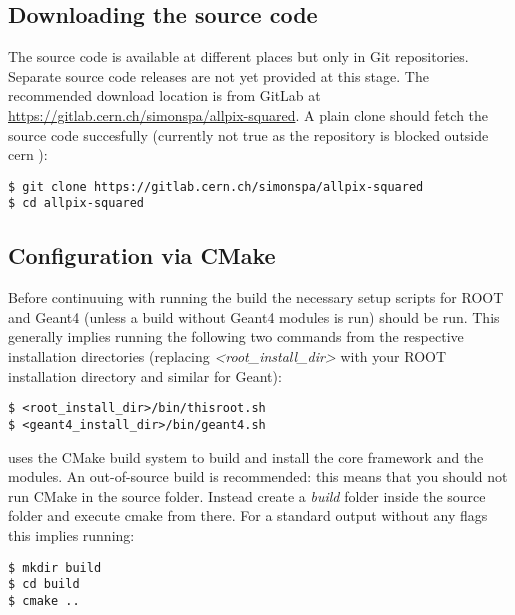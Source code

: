 \subsection{Downloading the source code}
The source code is available at different places but only in Git repositories. Separate source code releases are not yet provided at this stage. The recommended download location is from GitLab at \url{https://gitlab.cern.ch/simonspa/allpix-squared}. A plain clone should fetch the source code succesfully (\todo currently not true as the repository is blocked outside cern \todo):

\begin{verbatim}
$ git clone https://gitlab.cern.ch/simonspa/allpix-squared
$ cd allpix-squared
\end{verbatim}

\subsection{Configuration via CMake}
\label{sec:cmake_config}
Before continuuing with running the build the necessary setup scripts for ROOT and Geant4 (unless a build without Geant4 modules is run) should be run. This generally implies running the following two commands from the respective installation directories (replacing \textit{\textless root\_install\_dir\textgreater} with your ROOT installation directory and similar for Geant):
\begin{verbatim}
$ <root_install_dir>/bin/thisroot.sh
$ <geant4_install_dir>/bin/geant4.sh
\end{verbatim}

\apsq uses the CMake build system to build and install the core framework and the modules. An out-of-source build is recommended: this means that you should not run CMake in the source folder. Instead create a \textit{build} folder inside the source folder and execute cmake from there. For a standard output without any flags this implies running:

\begin{verbatim}
$ mkdir build
$ cd build
$ cmake ..
\end{verbatim}


